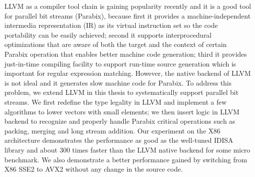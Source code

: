 
%
%


LLVM as a compiler tool chain is gaining popularity recently and it is a good tool for parallel bit streams (Parabix), because first it provides a machine-independent intermedia representation (IR) as its virtual instruction set so the code portability can be easily achieved; second it supports interprocedural optimizations that are aware of both the target and the context of certain Parabix operation that enables better machine code generation; third it provides just-in-time compiling facility to support run-time source generation which is important for regular expression matching. However, the native backend of LLVM is not ideal and it generates slow machine code for Parabix. To address this problem, we extend LLVM in this thesis to systematically support parallel bit streams. We first redefine the type legality in LLVM and implement a few algorithms to lower vectors with small elements; we then insert logic in LLVM backend to recognize and properly handle Parabix critical operations such as packing, merging and long stream addition. Our experiment on the X86 architecture demonstrates the performance as good as the well-tuned IDISA library and about 300 times faster than the LLVM native backend for some micro benchmark. We also demonstrate a better performance gained by switching from X86 SSE2 to AVX2 without any change in the source code.














